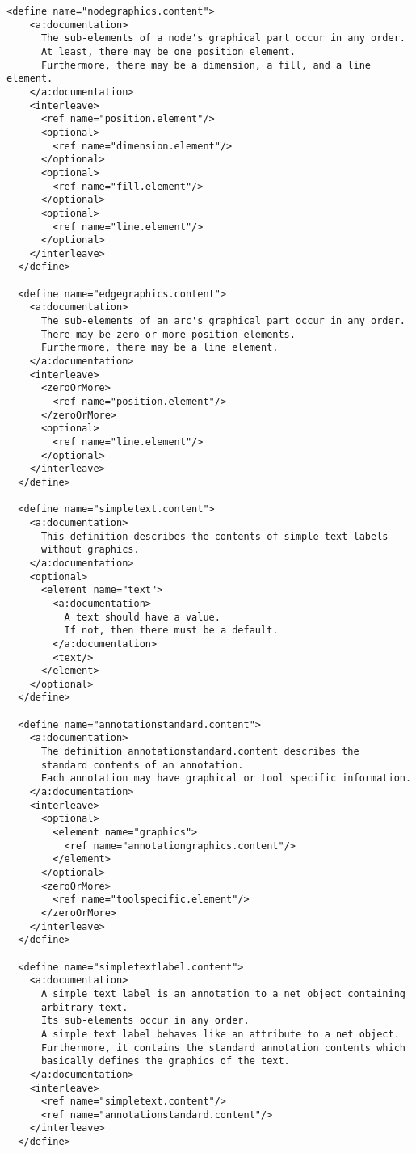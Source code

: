 \begin{lstlisting}[label=grammar_core,caption=RELAX NG implementation of PNML Core Model]
  <define name="nodegraphics.content">
    <a:documentation>
      The sub-elements of a node's graphical part occur in any order.
      At least, there may be one position element.
      Furthermore, there may be a dimension, a fill, and a line element.
    </a:documentation>
    <interleave>
      <ref name="position.element"/>
      <optional>
        <ref name="dimension.element"/>
      </optional>
      <optional>
        <ref name="fill.element"/>
      </optional>
      <optional>
        <ref name="line.element"/>
      </optional>
    </interleave>
  </define>

  <define name="edgegraphics.content">
    <a:documentation>
      The sub-elements of an arc's graphical part occur in any order.
      There may be zero or more position elements.
      Furthermore, there may be a line element.
    </a:documentation>
    <interleave>
      <zeroOrMore>
        <ref name="position.element"/>
      </zeroOrMore>
      <optional>
        <ref name="line.element"/>
      </optional>
    </interleave>
  </define>

  <define name="simpletext.content">
    <a:documentation>
      This definition describes the contents of simple text labels
      without graphics.
    </a:documentation>
    <optional>
      <element name="text">
        <a:documentation>
          A text should have a value. 
          If not, then there must be a default.
        </a:documentation>
        <text/>
      </element>
    </optional>
  </define>

  <define name="annotationstandard.content">
    <a:documentation>
      The definition annotationstandard.content describes the 
      standard contents of an annotation.
      Each annotation may have graphical or tool specific information.
    </a:documentation>
    <interleave>
      <optional>
        <element name="graphics">
          <ref name="annotationgraphics.content"/>
        </element>
      </optional>
      <zeroOrMore>
        <ref name="toolspecific.element"/>
      </zeroOrMore>
    </interleave>
  </define>

  <define name="simpletextlabel.content">
    <a:documentation>
      A simple text label is an annotation to a net object containing 
      arbitrary text.
      Its sub-elements occur in any order.
      A simple text label behaves like an attribute to a net object.
      Furthermore, it contains the standard annotation contents which 
      basically defines the graphics of the text.
    </a:documentation>
    <interleave>
      <ref name="simpletext.content"/>
      <ref name="annotationstandard.content"/>
    </interleave>
  </define>


\end{lstlisting}
